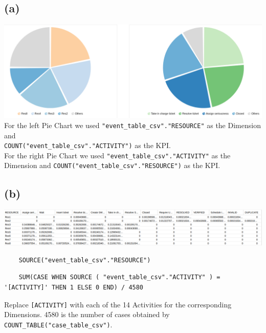 \documentclass[../../main.tex]{subfiles}
\begin{document}
\subsection*{(a)}
\includegraphics[width=\columnwidth]{img/Celonis_a_Visualization.png}\\
For the left Pie Chart we used \verb|"event_table_csv"."RESOURCE"| as the Dimension and \\
\verb|COUNT("event_table_csv"."ACTIVITY")| as the KPI.\\
For the right Pie Chart we used \verb|"event_table_csv"."ACTIVITY"| as the Dimension and \verb|COUNT("event_table_csv"."RESOURCE")| as the KPI.


\subsection*{(b)}
\includegraphics[width=\columnwidth]{img/Celonis_b_OLAP.png}\\
\begin{verbatim}
	SOURCE("event_table_csv"."RESOURCE")
\end{verbatim}
\begin{lstlisting}
	SUM(CASE WHEN SOURCE ( "event_table_csv"."ACTIVITY" ) = '[ACTIVITY]' THEN 1 ELSE 0 END) / 4580
\end{lstlisting}
Replace \verb|[ACTIVITY]| with each of the 14 Activities for the corresponding Dimensions. 4580 is the number of cases obtained by \verb|COUNT_TABLE("case_table_csv")|.
\end{document}
